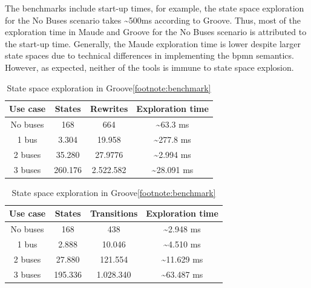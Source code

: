 \documentclass{jot}
\begin{document}
The benchmarks include start-up times, for example, the state space exploration for the \textsf{No Buses} scenario takes \textasciitilde 500ms according to Groove.
Thus, most of the exploration time in Maude and Groove for the \textsf{No Buses} scenario is attributed to the start-up time.
Generally, the Maude exploration time is lower despite larger state spaces due to technical differences in implementing the \gls*{bpmn} semantics.
However, as expected, neither of the tools is immune to state space explosion.

\begin{table}
\centering
\begin{tabular}{|c || c | c | c |}
 \hline
 Use case & States & Rewrites & Exploration time \\
 \hline\hline
 No buses & 168 & 664 & \textasciitilde 63.3 ms \\
 \hline
 1 bus & 3.304 & 19.958 & \textasciitilde 277.8 ms \\
 \hline
 2 buses & 35.280 & 27.9776 & \textasciitilde 2.994 ms \\
 \hline
 3 buses & 260.176 & 2.522.582 & \textasciitilde 28.091 ms \\
 \hline
\end{tabular}
\caption[State space exploration in Maude]{State space exploration in Maude\footnotemark}
\label{table:maudeRuntime}

\bigskip

\begin{tabular}{|c || c | c | c |}
 \hline
 Use case & States & Transitions & Exploration time \\
 \hline\hline
 No buses & 168 & 438 & \textasciitilde 2.948 ms \\
 \hline
 1 bus & 2.888 & 10.046 & \textasciitilde 4.510 ms \\
 \hline
 2 buses & 27.880 & 121.554 & \textasciitilde 11.629 ms \\
 \hline
 3 buses & 195.336 & 1.028.340 & \textasciitilde 63.487 ms \\
 \hline
\end{tabular}
\caption[State space exploration in Groove]{State space exploration in Groove\cref{footnote:benchmark}}
\label{table:grooveRuntime}

\end{table}

\end{document}
